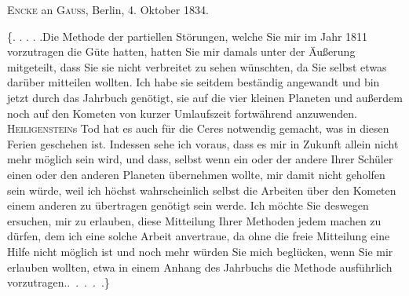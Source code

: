 \par{}\bigskip
\begin{center}
\textsc{Encke} an \textsc{Gauss}, Berlin, 4. Oktober 1834.
\end{center}
\noindent\hspace*{\parindent}\{. . . . .\quad Die Methode der partiellen Störungen, welche Sie mir im Jahr 1811 vorzutragen die Güte hatten, hatten Sie mir damals unter der Äußerung mitgeteilt, dass Sie sie nicht verbreitet zu sehen wünschten, da Sie selbst etwas darüber mitteilen wollten. Ich habe sie seitdem beständig angewandt und bin jetzt durch das Jahrbuch genötigt, sie auf die vier kleinen Planeten und außerdem noch auf den Kometen von kurzer Umlaufszeit fortwährend anzuwenden. \textsc{Heiligenstein}s Tod hat es auch für die Ceres notwendig gemacht, was in diesen Ferien geschehen ist. Indessen sehe ich voraus, dass es mir in Zukunft allein nicht mehr möglich sein wird, und dass, selbst wenn ein oder der andere Ihrer Schüler einen oder den anderen Planeten übernehmen wollte, mir damit nicht geholfen sein würde, weil ich höchst wahrscheinlich selbst die Arbeiten über den Kometen einem anderen zu übertragen genötigt sein werde. Ich möchte Sie deswegen ersuchen, mir zu erlauben, diese Mitteilung Ihrer Methoden jedem machen zu dürfen, dem ich eine solche Arbeit anvertraue, da ohne die freie Mitteilung eine Hilfe nicht möglich ist und noch mehr würden Sie mich beglücken, wenn Sie mir erlauben wollten, etwa in einem Anhang des Jahrbuchs die Methode ausführlich vorzutragen.\quad\mbox{. . . . .\}}
\par
